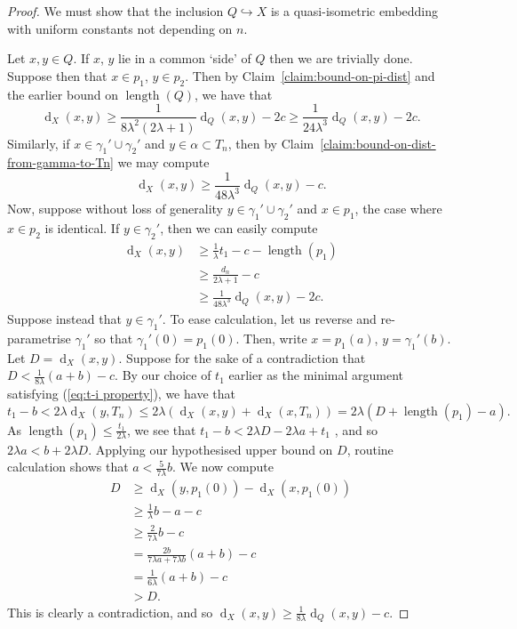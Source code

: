 \documentclass[10pt,a4paper]{amsart}
\DeclareMathOperator{\dist}{d}
\DeclareMathOperator{\length}{length}
\newcommand{\into}{\hookrightarrow}
\begin{document}
    \begin{proof}
        We must show that the inclusion $Q \into X$ is a quasi-isometric embedding with uniform constants not depending on $n$. 
        
        Let $x,y \in Q$. If $x$, $y$ lie in a common `side' of $Q$ then we are trivially done. Suppose then that $x \in p_1$, $y \in p_2$. Then by Claim~\ref{claim:bound-on-pi-dist} and the earlier bound on $\length(Q)$, we have that 
        $$
        \dist_X(x,y) \geq \frac{1}{8\lambda^2(2\lambda+1)} \dist_Q(x,y) - 2c \geq \frac 1 {24\lambda^3} \dist_Q(x,y) - 2c.
        $$
        Similarly, if $x \in \gamma_1' \cup \gamma_2'$ and $y \in \alpha \subset T_n$, then by Claim~\ref{claim:bound-on-dist-from-gamma-to-Tn} we may compute
        $$
        \dist_X(x,y) \geq \frac 1 {48\lambda^3} \dist_Q(x,y) - c.
        $$
        Now, suppose without loss of generality $y \in \gamma_1' \cup \gamma_2'$ and $x \in p_1$, the case where $x \in p_2$ is identical. 
        If $y \in \gamma_2'$, then we can easily compute 
        \begin{align*}
            \dist_X(x,y) &\geq \frac 1 \lambda t_1 - c - \length(p_1) \\
            &\geq \frac{d_n}{2\lambda+1} - c \\
            & \geq \frac{1}{48\lambda^3} \dist_Q(x,y) - 2c.
        \end{align*}
        Suppose instead that $y \in \gamma_1'$. To ease calculation, let us reverse and re-parametrise $\gamma_1'$ so that $\gamma_1'(0) = p_1(0)$. Then, write $x = p_1(a)$, $y = \gamma_1'(b)$. Let $D = \dist_X(x,y)$. 
        Suppose for the sake of a contradiction that $D < \frac 1 {8\lambda} (a+b) - c$.
        By our choice of $t_1$ earlier as the minimal argument satisfying (\ref{eq:t-i property}), we have that 
        $$
            t_1 - b < 2\lambda \dist_X(y, T_n) \leq 2\lambda (\dist_X(x,y) + \dist_X(x,T_n)) = 2\lambda(D + \length(p_1) - a).
        $$
        As $\length(p_1) \leq \frac {t_1}{2\lambda}$, we see that
        $t_1 - b < 2\lambda D - 2\lambda a + t_1$ , and so $2\lambda a < b + 2\lambda D$. 
        Applying our hypothesised upper bound on $D$, routine  calculation shows that 
        $
        a < \frac 5{7\lambda} b
        $. 
        We now compute 
        \begin{align*}
            D &\geq \dist_X(y,p_1(0)) - \dist_X(x,p_1(0)) \\
            &\geq \frac 1 \lambda b - a - c \\
            &\geq \frac 2 {7\lambda }b - c \\
            &= \frac {2b}{7\lambda a + 7\lambda b}(a+b) - c \\
            &= \frac {1}{6\lambda}(a+b) - c \\
            &> D.
        \end{align*}
        This is clearly a contradiction, and so $\dist_X(x,y) \geq \frac 1 {8\lambda} \dist_Q(x,y) -c$.
        

\end{proof}
\end{document}

